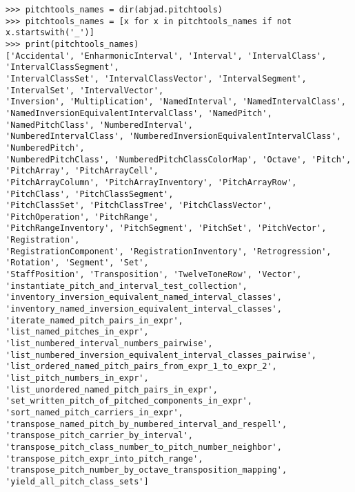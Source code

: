 \begin{abjadbookoutput}
\begin{singlespacing}
\vspace{-0.5\baselineskip}
\begin{lstlisting}
>>> pitchtools_names = dir(abjad.pitchtools)
>>> pitchtools_names = [x for x in pitchtools_names if not x.startswith('_')]
>>> print(pitchtools_names)
['Accidental', 'EnharmonicInterval', 'Interval', 'IntervalClass', 'IntervalClassSegment',
'IntervalClassSet', 'IntervalClassVector', 'IntervalSegment', 'IntervalSet', 'IntervalVector',
'Inversion', 'Multiplication', 'NamedInterval', 'NamedIntervalClass',
'NamedInversionEquivalentIntervalClass', 'NamedPitch', 'NamedPitchClass', 'NumberedInterval',
'NumberedIntervalClass', 'NumberedInversionEquivalentIntervalClass', 'NumberedPitch',
'NumberedPitchClass', 'NumberedPitchClassColorMap', 'Octave', 'Pitch', 'PitchArray', 'PitchArrayCell',
'PitchArrayColumn', 'PitchArrayInventory', 'PitchArrayRow', 'PitchClass', 'PitchClassSegment',
'PitchClassSet', 'PitchClassTree', 'PitchClassVector', 'PitchOperation', 'PitchRange',
'PitchRangeInventory', 'PitchSegment', 'PitchSet', 'PitchVector', 'Registration',
'RegistrationComponent', 'RegistrationInventory', 'Retrogression', 'Rotation', 'Segment', 'Set',
'StaffPosition', 'Transposition', 'TwelveToneRow', 'Vector',
'instantiate_pitch_and_interval_test_collection',
'inventory_inversion_equivalent_named_interval_classes',
'inventory_named_inversion_equivalent_interval_classes', 'iterate_named_pitch_pairs_in_expr',
'list_named_pitches_in_expr', 'list_numbered_interval_numbers_pairwise',
'list_numbered_inversion_equivalent_interval_classes_pairwise',
'list_ordered_named_pitch_pairs_from_expr_1_to_expr_2', 'list_pitch_numbers_in_expr',
'list_unordered_named_pitch_pairs_in_expr', 'set_written_pitch_of_pitched_components_in_expr',
'sort_named_pitch_carriers_in_expr', 'transpose_named_pitch_by_numbered_interval_and_respell',
'transpose_pitch_carrier_by_interval', 'transpose_pitch_class_number_to_pitch_number_neighbor',
'transpose_pitch_expr_into_pitch_range', 'transpose_pitch_number_by_octave_transposition_mapping',
'yield_all_pitch_class_sets']
\end{lstlisting}
\end{singlespacing}
\end{abjadbookoutput}

